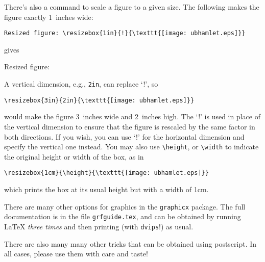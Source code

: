 \documentclass[a4paper]{article}
\begin{document}
There's also a command to scale a figure to a given size.  The following
makes the figure exactly 1~inches wide:
\begin{verbatim}
Resized figure: \resizebox{1in}{!}{\texttt{[image: ubhamlet.eps]}}
\end{verbatim}
gives
\begin{center}
Resized figure: 
\end{center}

A vertical dimension, e.g., \verb|2in|, can replace `!', so
\begin{verbatim}
\resizebox{3in}{2in}{\texttt{[image: ubhamlet.eps]}}
\end{verbatim}
would make the figure 3~inches wide and 2~inches high.
The `!' is used in place of the vertical dimension to ensure
that the figure is rescaled by the same factor in both directions.
If you wish, you can use `!' for the horizontal dimension
and specify the vertical one instead.
You may also use \verb|\height|, or \verb|\width| to indicate
the original height or width of the box, as
in
\begin{verbatim}
\resizebox{1cm}{\height}{\texttt{[image: ubhamlet.eps]}}
\end{verbatim}
which prints the box at its usual height but with a width of 1cm.

There are many other options for graphics in the 
\verb|graphicx| package.  The full documentation is in the file
\verb|grfguide.tex|, and can be obtained by 
running \LaTeX{} \textit{three times} and then 
printing (with \verb|dvips|!) as usual. 

There are also many many other tricks that can be obtained
using postscript. In all cases, please use them with care and taste!
\end{document}

